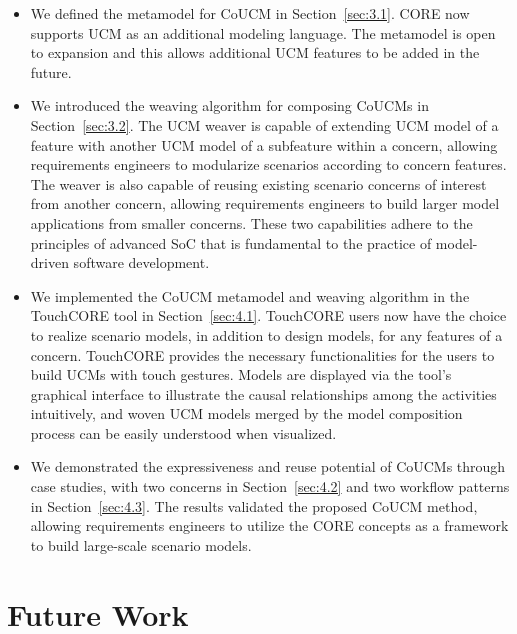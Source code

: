 \begin{itemize}
	
	\item We defined the metamodel for CoUCM in Section~\ref{sec:3.1}. CORE now supports UCM as an additional modeling language. The metamodel is open to expansion and this allows additional UCM features to be added in the future.
	
	\item We introduced the weaving algorithm for composing CoUCMs in Section~\ref{sec:3.2}. The UCM weaver is capable of extending UCM model of a feature with another UCM model of a subfeature within a concern, allowing requirements engineers to modularize scenarios according to concern features. The weaver is also capable of reusing existing scenario concerns of interest from another concern, allowing requirements engineers to build larger model applications from smaller concerns. These two capabilities adhere to the principles of advanced SoC that is fundamental to the practice of model-driven software development.
	
	\item We implemented the CoUCM metamodel and weaving algorithm in the TouchCORE tool in Section~\ref{sec:4.1}. TouchCORE users now have the choice to realize scenario models, in addition to design models, for any features of a concern. TouchCORE provides the necessary functionalities for the users to build UCMs with touch gestures. Models are displayed via the tool's graphical interface to illustrate the causal relationships among the activities intuitively, and woven UCM models merged by the model composition process can be easily understood when visualized.
	
	\item We demonstrated the expressiveness and reuse potential of CoUCMs through case studies, with two concerns in Section~\ref{sec:4.2} and two workflow patterns in Section~\ref{sec:4.3}. The results validated the proposed CoUCM method, allowing requirements engineers to utilize the CORE concepts as a framework to build large-scale scenario models.
	
\end{itemize}

\section{Future Work} \label{sec:5.2}

